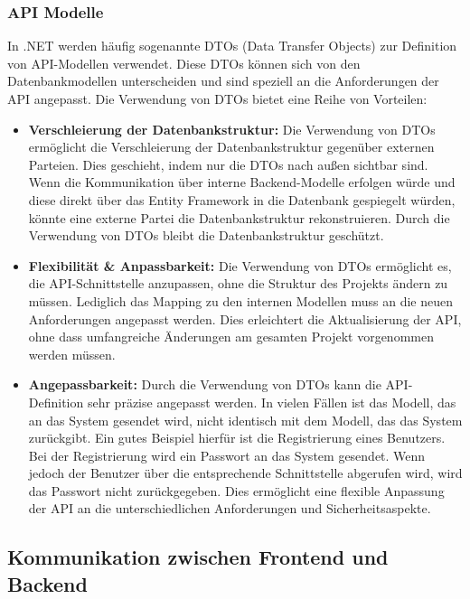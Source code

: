 \subsubsection{API Modelle}

In .NET werden häufig sogenannte DTOs (Data Transfer Objects) 
zur Definition von API-Modellen verwendet. Diese DTOs können sich von den Datenbankmodellen 
unterscheiden und sind speziell an die Anforderungen der API angepasst. 
Die Verwendung von DTOs bietet eine Reihe von Vorteilen:

\begin{itemize}
  \item \textbf{Verschleierung der Datenbankstruktur:} Die Verwendung von DTOs ermöglicht die Verschleierung der Datenbankstruktur
   gegenüber externen Parteien. Dies geschieht, indem nur die DTOs nach außen sichtbar sind. Wenn die Kommunikation
  über interne Backend-Modelle erfolgen würde und diese direkt über das Entity Framework in die Datenbank gespiegelt würden, 
  könnte eine externe Partei die Datenbankstruktur rekonstruieren. Durch die Verwendung von DTOs bleibt die Datenbankstruktur geschützt.
  \item \textbf{Flexibilität \& Anpassbarkeit:} Die Verwendung von DTOs ermöglicht es, die API-Schnittstelle anzupassen, 
  ohne die Struktur des Projekts ändern zu müssen. Lediglich das Mapping zu den internen Modellen muss an die neuen Anforderungen 
  angepasst werden. Dies erleichtert die Aktualisierung der API, ohne dass umfangreiche Änderungen am gesamten Projekt vorgenommen 
  werden müssen.
  \item \textbf{Angepassbarkeit:} Durch die Verwendung von DTOs kann die API-Definition sehr präzise angepasst werden. 
  In vielen Fällen ist das Modell, das an das System gesendet wird, nicht identisch mit dem Modell, das das System zurückgibt. 
  Ein gutes Beispiel hierfür ist die Registrierung eines Benutzers. Bei der Registrierung wird ein Passwort an das System gesendet. 
  Wenn jedoch der Benutzer über die entsprechende Schnittstelle abgerufen wird, wird das Passwort nicht zurückgegeben. 
  Dies ermöglicht eine flexible Anpassung der API an die unterschiedlichen Anforderungen und Sicherheitsaspekte.
\end{itemize}

\subsection{Kommunikation zwischen Frontend und Backend}


